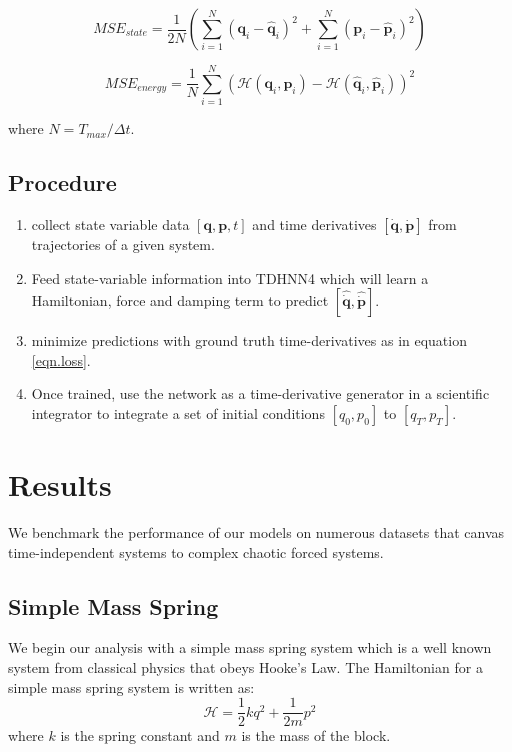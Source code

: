 \documentclass[twoside]{article}
\begin{document}
\begin{equation}
MSE_{state} = \frac{1}{2N} (\sum_{i=1}^N (\mathbf{q}_i-\hat{\mathbf{q}}_i)^2 + \sum_{i=1}^N (\mathbf{p}_i - \hat{\mathbf{p}}_i)^2)
\end{equation}

\begin{equation}
MSE_{energy} = \frac{1}{N} \sum_{i=1}^N (\mathcal{H}(\mathbf{q}_i,\mathbf{p}_i)-\mathcal{H}(\hat{\mathbf{q}}_i,\hat{\mathbf{p}}_i))^2
\end{equation}

where $N = T_{max}/\Delta t $.

\subsection*{Procedure}

\begin{enumerate}
\item collect state variable data $[\mathbf{q},\mathbf{p},t]$ and time derivatives $[\dot{\mathbf{q}},\dot{\mathbf{p}}]$ from trajectories of a given system.
\item Feed state-variable information into TDHNN4 which will learn a Hamiltonian, force and damping term to predict $[\hat{\dot{\mathbf{q}}},\hat{\dot{\mathbf{p}}}]$.
\item minimize predictions with ground truth time-derivatives as in equation \ref{eqn.loss}.
\item Once trained, use the network as a time-derivative generator in a scientific integrator to integrate a set of initial conditions $[q_0,p_0]$ to $[q_T,p_T]$.
\end{enumerate}


\section{Results}

We benchmark the performance of our models on numerous datasets that canvas time-independent systems to complex chaotic forced systems. 

\subsection{Simple Mass Spring}

We begin our analysis with a simple mass spring system which is a well known system from classical physics that obeys Hooke's Law. The Hamiltonian for a simple mass spring system is written as:
\begin{equation}
\mathcal{H} = \frac{1}{2}kq^2 + \frac{1}{2m}p^2 
\end{equation}
where $k$ is the spring constant and $m$ is the mass of the block. 
\end{document}
